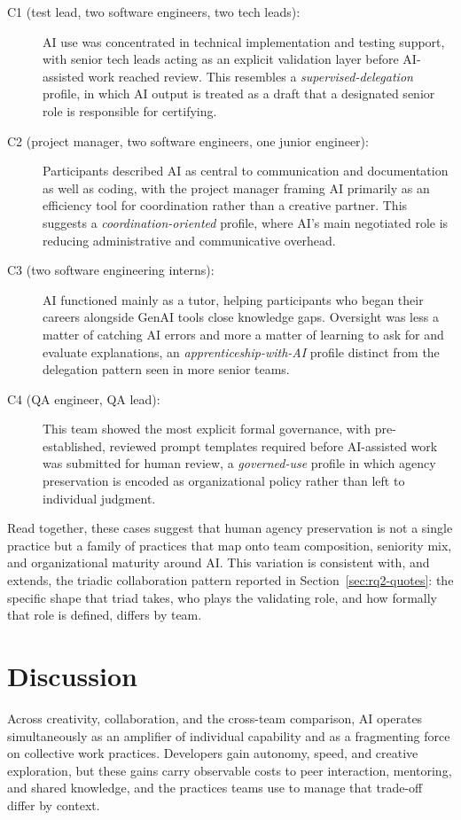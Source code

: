 \documentclass[10pt,journal,compsoc]{IEEEtran}
\begin{document}
\begin{description}
\item[C1 (test lead, two software engineers, two tech leads):] AI use was concentrated in technical implementation and testing support, with senior tech leads acting as an explicit validation layer before AI-assisted work reached review. This resembles a \textit{supervised-delegation} profile, in which AI output is treated as a draft that a designated senior role is responsible for certifying.
\item[C2 (project manager, two software engineers, one junior engineer):] Participants described AI as central to communication and documentation as well as coding, with the project manager framing AI primarily as an efficiency tool for coordination rather than a creative partner. This suggests a \textit{coordination-oriented} profile, where AI's main negotiated role is reducing administrative and communicative overhead.
\item[C3 (two software engineering interns):] AI functioned mainly as a tutor, helping participants who began their careers alongside GenAI tools close knowledge gaps. Oversight was less a matter of catching AI errors and more a matter of learning to ask for and evaluate explanations, an \textit{apprenticeship-with-AI} profile distinct from the delegation pattern seen in more senior teams.
\item[C4 (QA engineer, QA lead):] This team showed the most explicit formal governance, with pre-established, reviewed prompt templates required before AI-assisted work was submitted for human review, a \textit{governed-use} profile in which agency preservation is encoded as organizational policy rather than left to individual judgment.
\end{description}

Read together, these cases suggest that human agency preservation is not a single practice but a family of practices that map onto team composition, seniority mix, and organizational maturity around AI. This variation is consistent with, and extends, the triadic collaboration pattern reported in Section~\ref{sec:rq2-quotes}: the specific shape that triad takes, who plays the validating role, and how formally that role is defined, differs by team.

\section{Discussion}

Across creativity, collaboration, and the cross-team comparison, AI operates simultaneously as an amplifier of individual capability and as a fragmenting force on collective work practices. Developers gain autonomy, speed, and creative exploration, but these gains carry observable costs to peer interaction, mentoring, and shared knowledge, and the practices teams use to manage that trade-off differ by context.
\end{document}
